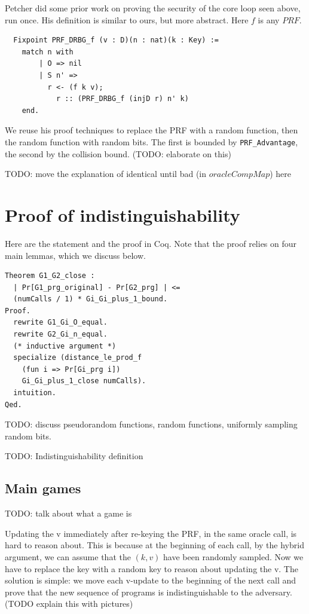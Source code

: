 \documentclass[12pt,lot, lof]{puthesis}
\newcommand{\li} {\lstinline}
\begin{document}
{Petcher did some prior work on proving the security of the core loop seen above, run once. His definition is similar to ours, but more abstract. Here $f$ is any $PRF$.

\begin{lstlisting}
  Fixpoint PRF_DRBG_f (v : D)(n : nat)(k : Key) :=
    match n with
        | O => nil
        | S n' => 
          r <- (f k v);
            r :: (PRF_DRBG_f (injD r) n' k)
    end.
\end{lstlisting}

We reuse his proof techniques to replace the PRF with a random function, then the random function with random bits. The first is bounded by \li|PRF_Advantage|, the second by the collision bound. (TODO: elaborate on this)

TODO: move the explanation of identical until bad (in $oracleCompMap$) here

\section{Proof of indistinguishability}

Here are the statement and the proof in Coq. Note that the proof relies on four main lemmas, which we discuss below.

\begin{lstlisting}
Theorem G1_G2_close :
  | Pr[G1_prg_original] - Pr[G2_prg] | <= 
  (numCalls / 1) * Gi_Gi_plus_1_bound.
Proof.
  rewrite G1_Gi_O_equal.
  rewrite G2_Gi_n_equal.
  (* inductive argument *)
  specialize (distance_le_prod_f 
  	(fun i => Pr[Gi_prg i]) 
	Gi_Gi_plus_1_close numCalls).
  intuition.
Qed.
\end{lstlisting}

TODO: discuss pseudorandom functions, random functions, uniformly sampling random bits.

TODO: Indistinguishability definition

\subsection{Main games}

TODO: talk about what a game is

Updating the v immediately after re-keying the PRF, in the same oracle call, is hard to reason about. This is because at the beginning of each call, by the hybrid argument, we can assume that the $(k,v)$ have been randomly sampled. Now we have to replace the key with a random key to reason about updating the v. The solution is simple: we move each v-update to the beginning of the next call and prove that the new sequence of programs is indistinguishable to the adversary. (TODO explain this with pictures)

}
\end{document}
